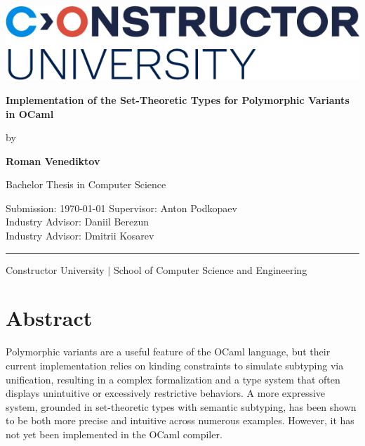 \documentclass[a4paper,11pt,oneside]{article}
\theoremstyle{definition}
\newcommand{\mylastname}{Venediktov}
\newcommand{\myfirstname}{Roman}
\newcommand{\myname}{\myfirstname{} \mylastname{}}
\newcommand{\mytitle}{Implementation of the Set-Theoretic Types
                      for Polymorphic Variants in OCaml}
\newcommand{\mysupervisor}{Anton Podkopaev}
\newcommand{\myrao}{Daniil Berezun}
\newcommand{\myrat}{Dmitrii Kosarev}
\begin{document}

\thispagestyle{empty}

\begin{flushright}
  \includegraphics[scale=0.8]{bsc-logo}
\end{flushright}
\vspace*{40mm}
\begin{center}
  \huge
  \textbf{\mytitle}
\end{center}
\vspace*{4mm}
\begin{center}
  \Large by
\end{center}
\vspace*{4mm}
\begin{center}
  \LARGE
  \textbf{\myname}
\end{center}
\vspace*{20mm}
\begin{center}
  \Large
  Bachelor Thesis in Computer Science
\end{center}
\vfill
\begin{flushleft}
  \large
  Submission: \today \hfill
  Supervisor: \mysupervisor\\ \hfill
  Industry Advisor: \myrao\\ \hfill
  Industry Advisor: \myrat\\
  \rule{\textwidth}{1pt}
\end{flushleft}
\begin{center}
  Constructor University $|$
  School of Computer Science and Engineering
\end{center}

\newpage

\section*{Abstract}

Polymorphic variants are a useful feature of the OCaml language, but their current implementation relies on kinding constraints to simulate subtyping via unification, resulting in a complex formalization and a type system that often displays unintuitive or excessively restrictive behaviors. A more expressive system, grounded in set-theoretic types with semantic subtyping, has been shown to be both more precise and intuitive across numerous examples. However, it has not yet been implemented in the OCaml compiler.
\end{document}
